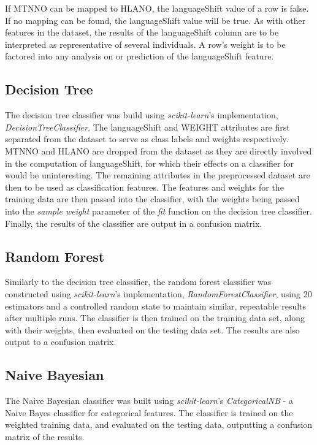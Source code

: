 \documentclass[10pt, conference, compsocconf]{IEEEtran}
\begin{document}
If MTNNO can be mapped to HLANO, the languageShift value of a row is false.  If no mapping can be found, the languageShift value will be true.  As with other features in the dataset, the results of the languageShift column are to be interpreted as representative of several individuals.  A row's weight is to be factored into any analysis on or prediction of the languageShift feature.


\subsection{Decision Tree}

The decision tree classifier was build using \textit{scikit-learn}'s implementation, \textit{DecisionTreeClassifier}.  The languageShift and WEIGHT attributes are first separated from the dataset to serve as class labels and weights respectively.  MTNNO and HLANO are dropped from the dataset as they are directly involved in the computation of languageShift, for which their effects on a classifier for would be uninteresting.  The remaining attributes in the preprocessed dataset are then to be used as classification features. The features and weights for the training data are then passed into the classifier, with the weights being passed into the \textit{sample weight} parameter of the \textit{fit} function on the decision tree classifier. Finally, the results of the classifier are output in a confusion matrix.

\subsection{Random Forest}

Similarly to the decision tree classifier, the random forest classifier was constructed using \textit{scikit-learn}'s implementation, \textit{RandomForestClassifier}, using 20 estimators and a controlled random state to maintain similar, repeatable results after multiple runs. The classifier is then trained on the training data set, along with their weights, then evaluated on the testing data set. The results are also output to a confusion matrix.

\subsection{Naive Bayesian}

The Naive Bayesian classifier was built using \textit{scikit-learn}'s \textit{CategoricalNB} - a Naive Bayes classifier for categorical features.  The classifier is trained on the weighted training data, and evaluated on the testing data, outputting a confusion matrix of the results.
\end{document}
